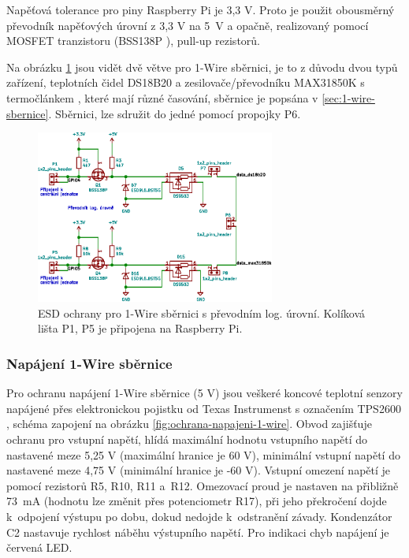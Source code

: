 Napěťová tolerance pro piny Raspberry Pi je 3,3 V. Proto je použit obousměrný převodník napěťových úrovní z 3,3 V na 5~V a opačně, realizovaný pomocí MOSFET tranzistoru (BSS138P \cite{bss138p}), pull-up rezistorů.

Na obrázku \ref{fig:ochrany-1-wire} jsou vidět dvě větve pro 1-Wire sběrnici, je to z důvodu dvou typů zařízení, teplotních čidel DS18B20 a zesilovače/převodníku MAX31850K \cite{max31850k} s termočlánkem , které mají různé časování, sběrnice je popsána v \ref{sec:1-wire-sbernice}. Sběrnici, lze sdružit do jedné pomocí propojky P6.

\begin{figure}[H]
    \centering
    \includegraphics[width=0.7\textwidth]{images/svg/kicad/ochrany-1-wire.eps}
    \caption[ESD ochrany pro 1-Wire sběrnici s~převodníkem log. úrovní.]{ESD ochrany pro 1-Wire sběrnici s převodním log. úrovní. Kolíková lišta P1, P5 je připojena na Raspberry Pi.}
    \label{fig:ochrany-1-wire}
\end{figure}


\subsubsection{Napájení 1-Wire sběrnice}
\label{sec:napajeni-1-wire-sbernice}
Pro ochranu napájení 1-Wire sběrnice (5 V) jsou veškeré koncové teplotní senzory napájené přes elektronickou pojistku od Texas Instrumenst s označením TPS2600 \cite{tps26600}, schéma zapojení na obrázku \ref{fig:ochrana-napajeni-1-wire}. Obvod zajišťuje ochranu pro vstupní napětí, hlídá maximální hodnotu vstupního napětí do nastavené meze 5,25 V (maximální hranice je 60 V), minimální vstupní napětí do nastavené meze 4,75 V (minimální hranice je -60 V). Vstupní omezení napětí je pomocí rezistorů R5, R10, R11 a~R12. Omezovací proud je nastaven na přibližně 73~mA (hodnotu lze změnit přes potenciometr R17), při jeho překročení dojde k~odpojení výstupu po dobu, dokud nedojde k~odstranění závady. Kondenzátor C2 nastavuje rychlost náběhu výstupního napětí. Pro indikaci chyb napájení je červená LED.

